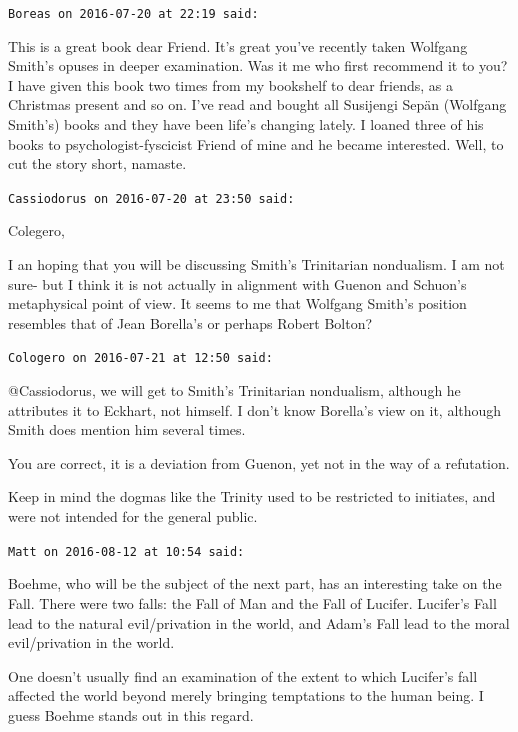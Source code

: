 \begin{footnotesize}\begin{sffamily}



\texttt{Boreas on 2016-07-20 at 22:19 said: }

This is a great book dear Friend. It's great you've recently taken Wolfgang Smith's opuses in deeper examination. Was it me who first recommend it to you? I have given this book two times from my bookshelf to dear friends, as a Christmas present and so on. I've read and bought all Susijengi Sepän (Wolfgang Smith's) books and they have been life's changing lately. I loaned three of his books to psychologist-fyscicist Friend of mine and he became interested. Well, to cut the story short, namaste.


\hfill

\texttt{Cassiodorus on 2016-07-20 at 23:50 said: }

Colegero,

I an hoping that you will be discussing Smith's Trinitarian nondualism. I am not sure- but I think it is not actually in alignment with Guenon and Schuon's metaphysical point of view. It seems to me that Wolfgang Smith's position resembles that of Jean Borella's or perhaps Robert Bolton?


\hfill

\texttt{Cologero on 2016-07-21 at 12:50 said: }

@Cassiodorus, we will get to Smith's Trinitarian nondualism, although he attributes it to Eckhart, not himself. I don't know Borella's view on it, although Smith does mention him several times.

You are correct, it is a deviation from Guenon, yet not in the way of a refutation.

Keep in mind the dogmas like the Trinity used to be restricted to initiates, and were not intended for the general public.


\hfill

\texttt{Matt on 2016-08-12 at 10:54 said: }

Boehme, who will be the subject of the next part, has an interesting take on the Fall. There were two falls: the Fall of Man and the Fall of Lucifer. Lucifer's Fall lead to the natural evil/privation in the world, and Adam's Fall lead to the moral evil/privation in the world.

One doesn't usually find an examination of the extent to which Lucifer's fall affected the world beyond merely bringing temptations to the human being. I guess Boehme stands out in this regard.



\end{sffamily}
\end{footnotesize}
